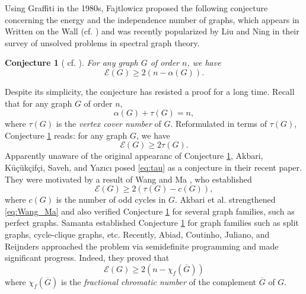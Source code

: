 \documentclass[11pt]{article}
\theoremstyle{plain}
\newtheorem{conjecture}[theorem]{Conjecture}
\numberwithin{equation}{section}
\begin{document}
Using Graffiti in the 1980s, Fajtlowicz \cite{DeLaVina_2005, Fajtlowicz_1980} proposed the following conjecture concerning the energy and the independence number of graphs, which appears in Written on the Wall (cf. \cite{Aouchiche_Hansen_2010}) and was recently popularized by Liu and Ning \cite{Liu_Ning_OpenProblems_2023} in their survey of unsolved problems in spectral graph theory. 

\begin{conjecture}[{\cite[Conjecture \#543, Table 6]{Aouchiche_Hansen_2010}} cf. \cite{Liu_Ning_OpenProblems_2023}]\label{conj:energy}
    For any graph $G$ of order $n$, we have 
    \[ \mathcal{E}(G)\ge 2(n-\alpha(G)).\]
\end{conjecture}

Despite its simplicity, the conjecture has resisted a proof for a long time. Recall that for any graph $G$ of order $n$,
\[ \alpha(G) + \tau(G) = n,\]
where $\tau(G)$ is the \emph{vertex cover number} of $G$. Reformulated in terms of $\tau(G)$, Conjecture \ref{conj:energy} reads: for any graph $G$, we have 
\begin{equation}\label{eq:tau}
   \mathcal{E}(G)\ge 2\tau(G). 
\end{equation}
Apparently unaware of the original appearanc of Conjecture \ref{conj:energy}, Akbari, K{\"u}{\c{c}}{\"u}k{\c{c}}if{\c{c}}i, Saveh, and Yaz{\i}c{\i} \cite{Akbari_2025_Vertex_cover} posed \eqref{eq:tau} as a conjecture in their recent paper. They were motivated by a result of Wang and Ma \cite{Wang_Ma_2017}, who established 
\begin{equation}\label{eq:Wang_Ma}
   \mathcal{E}(G)\ge 2(\tau(G)-c(G)), 
\end{equation}
where $c(G)$ is the number of odd cycles in $G$. Akbari et al. \cite{Akbari_2025_Vertex_cover} strengthened \eqref{eq:Wang_Ma} and also verified Conjecture \ref{conj:energy} for several graph families, such as perfect graphs. Samanta \cite{Samanta_2025} established Conjecture \ref{conj:energy} for graph families such as split graphs, cycle-clique graphs, etc. Recently, Abiad, Coutinho, Juliano, and Reijnders \cite{Abiad_2025_SDPlenses} approached the problem via semidefinite programming and made significant progress. Indeed, they proved that
\begin{equation}\label{eq:fractional_chromatic}
    \mathcal{E}(G)\ge 2(n- \chi_f(\overline{G}))
\end{equation}
where $\chi_f(\overline{G})$ is the \emph{fractional chromatic number} of the complement $\overline{G}$ of $G$. 
\end{document}
